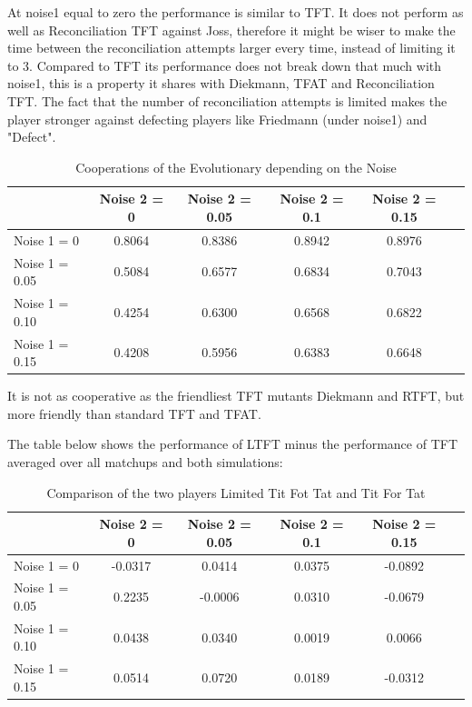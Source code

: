 \documentclass[11pt,twoside]{article}
\begin{document}
At noise1 equal to zero the performance is similar to TFT. It does not perform as well as Reconciliation TFT against Joss, therefore it might be wiser to make the time between the reconciliation attempts larger every time, instead of limiting it to 3. Compared to TFT its performance does not break down that much with noise1, this is a property it shares with Diekmann, TFAT and Reconciliation TFT. The fact that the number of reconciliation attempts is limited makes the player stronger against defecting players like Friedmann (under noise1) and "Defect".


\begin{table}[h]
 \begin{center}
\caption{Cooperations of the Evolutionary depending on the Noise} \vspace{3mm}
\begin{tabular}{|l|c|c|c|c|c|}
\hline
   	& Noise 2 = 0 & Noise 2 = 0.05& Noise 2 = 0.1& Noise 2 = 0.15 \\
  \hline
  Noise 1 = 0 	&     0.8064&    0.8386 &   0.8942    &0.8976 \\
 \hline
  Noise 1 = 0.05	 &    0.5084  &  0.6577&    0.6834  &  0.7043\\
 \hline
  Noise 1 = 0.10 	&0.4254  &  0.6300 &   0.6568 &   0.6822 \\
 \hline
  Noise 1 = 0.15 	&    0.4208   & 0.5956  &  0.6383  &  0.6648 \\
 \hline
\end{tabular}
 \end{center}
\end{table}

It is not as cooperative as the friendliest TFT mutants Diekmann and RTFT, but more friendly than standard TFT and TFAT.

The table below shows the performance of LTFT minus the performance of TFT averaged over all matchups and both simulations:

\begin{table}[h]
 \begin{center}
\caption{Comparison of the two players Limited Tit Fot Tat and Tit For Tat} \vspace{3mm}
\begin{tabular}{|l|c|c|c|c|c|}
\hline
   	& Noise 2 = 0 & Noise 2 = 0.05& Noise 2 = 0.1& Noise 2 = 0.15 \\
  \hline
  Noise 1 = 0 	&    -0.0317 &   0.0414 &   0.0375&   -0.0892 \\
 \hline
  Noise 1 = 0.05	 &    0.2235 &  -0.0006  &  0.0310  & -0.0679\\
 \hline
  Noise 1 = 0.10 	&     0.0438&    0.0340  &  0.0019  &  0.0066 \\
 \hline
  Noise 1 = 0.15 	&     0.0514  &  0.0720  &  0.0189 &  -0.0312 \\
 \hline
\end{tabular}
 \end{center}
\end{table}
\end{document}
